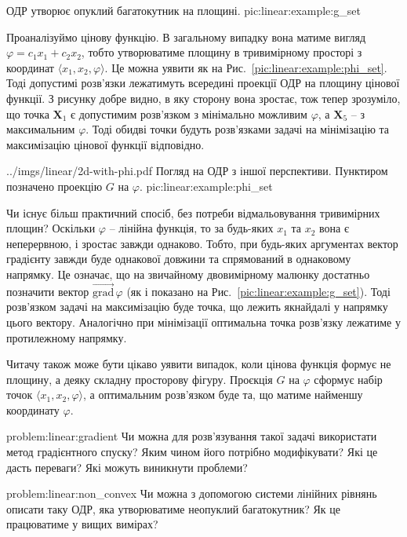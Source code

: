 \documentclass[\main/book.tex]{subfiles}
\begin{document}
 {ОДР утворює опуклий багатокутник на площині.}
 {pic:linear:example:g_set}

Проаналізуймо цінову функцію. В загальному випадку вона матиме вигляд $\varphi = c_1 x_1 + c_2 x_2$, тобто утворюватиме площину в тривимірному просторі з координат $\langle x_1, x_2, \varphi \rangle$. Це можна уявити як на Рис.~\ref{pic:linear:example:phi_set}. Тоді допустимі розв'язки лежатимуть всередині проекції ОДР на площину цінової функції. З рисунку добре видно, в яку сторону вона зростає, тож тепер зрозуміло, що точка $\mathbf{X}_1$ є допустимим розв'язком з мінімально можливим $\varphi$, а $\mathbf{X}_5$ -- з максимальним $\varphi$. Тоді обидві точки будуть розв'язками задачі на мінімізацію та максимізацію цінової функції відповідно.

\illustration
 {../imgs/linear/2d-with-phi.pdf}
 {Погляд на ОДР з іншої перспективи. Пунктиром позначено проекцію $G$ на $\varphi$.}
 {pic:linear:example:phi_set}

Чи існує більш практичний спосіб, без потреби відмальовування тривимірних площин? Оскільки $\varphi$ -- лінійна функція, то за будь-яких $x_1$ та $x_2$ вона є неперервною, і зростає завжди однаково. Тобто, при будь-яких аргументах вектор градієнту завжди буде однакової довжини та спрямований в однаковому напрямку. Це означає, що на звичайному двовимірному малюнку достатньо позначити вектор $\overrightarrow{\mathrm{grad}}\,\varphi$ (як і показано на Рис.~\ref{pic:linear:example:g_set}). Тоді розв'язком задачі на максимізацію буде точка, що лежить якнайдалі у напрямку цього вектору. Аналогічно при мінімізації оптимальна точка розв'язку лежатиме у протилежному напрямку.

\begin{note}
 Читачу також може бути цікаво уявити випадок, коли цінова функція формує не площину, а деяку складну просторову фігуру. Проєкція $G$ на $\varphi$ сформує набір точок $\langle x_1, x_2, \varphi \rangle$, а оптимальним розв'язком буде та, що матиме найменшу координату $\varphi$.
\end{note}

\begin{problem}{problem:linear:gradient}
 Чи можна для розв'язування такої задачі використати метод градієнтного спуску? Яким чином його потрібно модифікувати? Які це дасть переваги? Які можуть виникнути проблеми?
\end{problem}

\begin{problem}{problem:linear:non_convex}
 Чи можна з допомогою системи лінійних рівнянь описати таку ОДР, яка утворюватиме неопуклий багатокутник? Як це працюватиме у вищих вимірах?
\end{problem}
\end{document}
